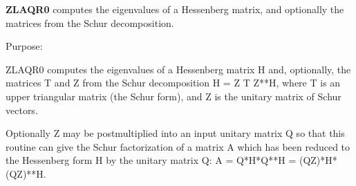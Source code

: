 {\bfseries Z\+L\+A\+Q\+R0} computes the eigenvalues of a Hessenberg matrix, and optionally the matrices from the Schur decomposition. 

 \begin{DoxyParagraph}{Purpose\+: }
\begin{DoxyVerb}    ZLAQR0 computes the eigenvalues of a Hessenberg matrix H
    and, optionally, the matrices T and Z from the Schur decomposition
    H = Z T Z**H, where T is an upper triangular matrix (the
    Schur form), and Z is the unitary matrix of Schur vectors.

    Optionally Z may be postmultiplied into an input unitary
    matrix Q so that this routine can give the Schur factorization
    of a matrix A which has been reduced to the Hessenberg form H
    by the unitary matrix Q:  A = Q*H*Q**H = (QZ)*H*(QZ)**H.\end{DoxyVerb}
 
\end{DoxyParagraph}

